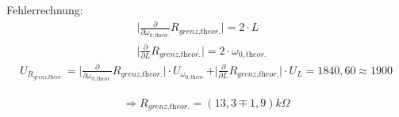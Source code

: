 \documentclass[a4paper]{scrartcl}
\numberwithin{equation}{subsection}
\begin{document}
Fehlerrechnung:
\begin{align*}
\vert \frac{\partial}{\partial \omega_{0,\textit{theor.}}}R_{\textit{grenz,theor.}}\vert = 2 \cdot L &\\
\vert \frac{\partial}{\partial L}R_{\textit{grenz,theor.}}\vert = 2 \cdot \omega_{0,\textit{theor.}} &
\end{align*}
\begin{align*}
U_{R_{\textit{grenz,theor.}}} = \vert \frac{\partial}{\partial \omega_{0,\textit{theor.}}}R_{\textit{grenz,theor.}}\vert \cdot U_{\omega_{0,\textit{theor.}}} + \vert \frac{\partial}{\partial L}R_{\textit{grenz,theor.}}\vert \cdot U_L = 1840,60 \approx 1900 
\end{align*}

\begin{align*}
\Rightarrow R_{\textit{grenz,theor.}} = (13,3 \mp 1,9) k \Omega
\end{align*}
\end{document}

